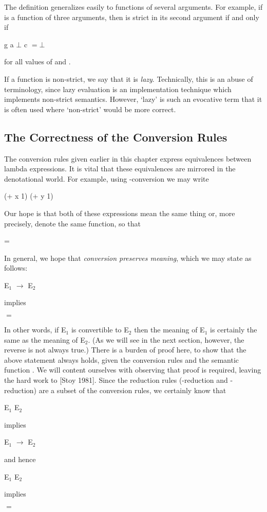 The definition generalizes easily to functions of several arguments. For
example, if  is a function of three arguments, then  is strict in its second
argument if and only if
\begin{mlcoded}
    g a $\bot$ c $= \bot$
\end{mlcoded}
for all values of  and .

If a function is non-strict, we say that it is \textit{lazy}. Technically, this is an abuse
of terminology, since lazy evaluation is an implementation technique which
implements non-strict semantics. However, `lazy' is such an evocative term
that it is often used where `non-strict' would be more correct.

\subsection{The Correctness of the Conversion Rules}

The conversion rules given earlier in this chapter express equivalences
between lambda expressions. It is vital that these equivalences are mirrored in
the denotational world. For example, using \ta-conversion we may write
\begin{mlcoded}
    (+ x 1) \conversion{\alpha} (+ y 1)
\end{mlcoded}
Our hope is that both of these expressions mean the same thing or, more
precisely, denote the same function, so that
\begin{mlcoded}
     = 
\end{mlcoded}
In general, we hope that \textit{conversion preserves meaning}, which we may state
as follows:
\begin{mlcoded}
    E$_1$ $\rightarrow$ E$_2$
\end{mlcoded}
implies
\begin{mlcoded}
     $=$ 
\end{mlcoded}
In other words, if E$_1$ is convertible to E$_2$ then the meaning of E$_1$ is certainly the
same as the meaning of E$_2$. (As we will see in the next section, however, the
reverse is not always true.) There is a burden of proof here, to show that the
above statement always holds, given the conversion rules and the semantic
function . We will content ourselves with observing that proof is required,
leaving the hard work to [Stoy 1981].
Since the reduction rules (\tb-reduction and \te-reduction) are a subset of the
conversion rules, we certainly know that
\begin{mlcoded}
    E$_1$ \reduction{\beta} E$_2$
\end{mlcoded}
implies
\begin{mlcoded}
    E$_1$ $\rightarrow$ E$_2$
\end{mlcoded}
and hence
\begin{mlcoded}
    E$_1$ \reduction{\beta} E$_2$
\end{mlcoded}
implies
\begin{mlcoded}
     $=$ 
\end{mlcoded}


